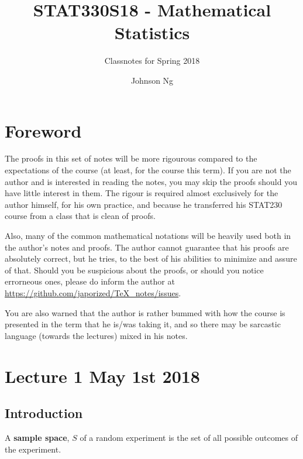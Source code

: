 \documentclass[notoc,notitlepage]{tufte-book}
\title{STAT330S18 - Mathematical Statistics}
\author{Johnson Ng}
\subtitle{Classnotes for Spring 2018}
\begin{document}


\chapter*{Foreword}
  \label{chapter:foreword}

\begin{fullwidth}
  The proofs in this set of notes will be more rigourous compared to the expectations of the course (at least, for the course this term). If you are not the author and is interested in reading the notes, you may skip the proofs should you have little interest in them. The rigour is required almost exclusively for the author himself, for his own practice, and because he transferred his STAT230 course from a class that is clean of proofs.

  Also, many of the common mathematical notations will be heavily used both in the author's notes and proofs. The author cannot guarantee that his proofs are absolutely correct, but he tries, to the best of his abilities to minimize and assure of that. Should you be suspicious about the proofs, or should you notice errorneous ones, please do inform the author at \url{https://github.com/japorized/TeX_notes/issues}.

  You are also warned that the author is rather bummed with how the course is presented in the term that he is/was taking it, and so there may be sarcastic language (towards the lectures) mixed in his notes.
\end{fullwidth}


\chapter{Lecture 1 May 1st 2018}
  \label{chapter:lecture_1_may_1st_2018}

\section{Introduction} %
\label{sec:introduction}

\begin{defn}\label{defn:sample_space}
  A \textbf{sample space}, \textbf{$S$} of a random experiment is the set of all possible outcomes of the experiment.
\end{defn}
\end{document}
